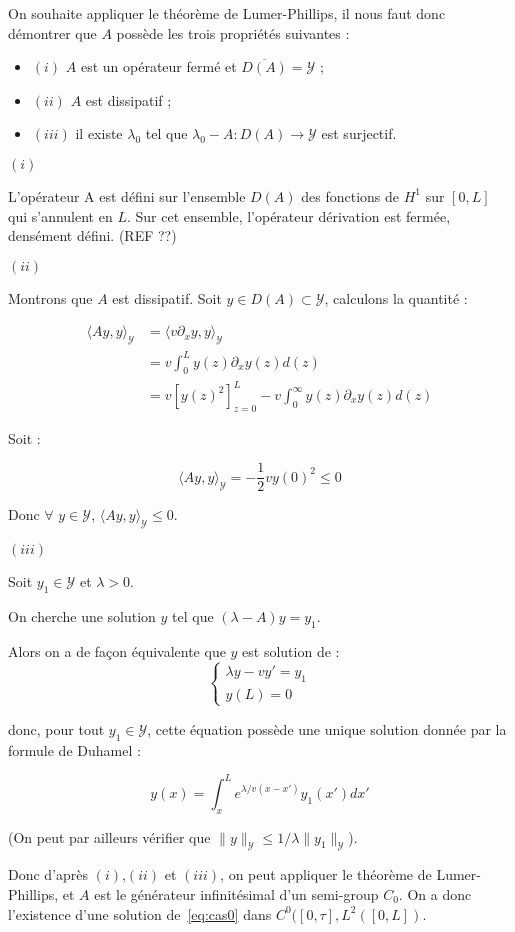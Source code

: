 \documentclass[a4paper]{article}
\begin{document}
\begin{preuve}
	On souhaite appliquer le théorème de Lumer-Phillips, 
	il nous faut donc démontrer que $A$ possède les trois propriétés suivantes :
\begin{itemize}
	\item $(i)$ $A$ est un opérateur fermé et $\overline{D(A)} = \mathscr{Y}$ ;
	\item $(ii)$ $A$ est dissipatif ;
	\item $(iii)$ il existe $\lambda_0$ tel que $\lambda_0 - A : D(A) \to \mathscr{Y}$ est surjectif.
\end{itemize}

\vspace{0.3cm}
$(i)$

L'opérateur A est défini sur l'ensemble $D(A)$ des fonctions de $H^1$ sur $[0,L]$ qui s'annulent en $L$. 
Sur cet ensemble, l'opérateur dérivation est fermée, densément défini.
(REF ??)


\vspace{0.3cm}
$(ii)$

Montrons que $A$ est dissipatif.
Soit $y \in D(A) \subset \mathscr{Y}$, 
calculons la quantité :

\[ \begin{split}
\langle Ay,y \rangle_{\mathscr{Y}} &= \langle v \partial_x y, y \rangle_{\mathscr{Y}}  \\
                     &= v \int_0^L y(z) \partial_x y(z) d(z) \\
					 & = v[y(z)^2]_{z=0}^L - v \int_0^\infty y(z) \partial_x y(z) d(z)
\end{split} \]

Soit :

\[ \langle Ay,y \rangle_{\mathscr{Y}} = -\frac{1}{2}vy(0)^2 \leq 0 \]

Donc $\forall$ $y \in \mathscr{Y}$, $\langle Ay,y \rangle_{\mathscr{Y}} \leq 0$.


\vspace{0.3cm}
$(iii)$

Soit $y_1 \in \mathscr{Y}$ et $\lambda >0$.

On cherche une solution $y$ tel que $(\lambda -A)y = y_1$.

Alors on a de façon équivalente que $y$ est solution de :
\[ \begin{cases}
\lambda y - v y' = y_1 \\
y(L) = 0
\end{cases}\]

donc, pour tout $y_1 \in \mathscr{Y}$, cette équation possède une unique solution donnée par la formule de Duhamel :

\[ y(x) =  \int_x^L e^{\lambda/v (x-x')}y_1(x')dx' \]

(On peut par ailleurs vérifier que $ \| y \|_{\mathscr{Y}} \leq 1/ \lambda \|y_1 \|_{\mathscr{Y}}$).

Donc d'après $(i)$,$(ii)$ et $(iii)$, on peut appliquer le théorème de Lumer-Phillips, et $A$ est le générateur infinitésimal d'un semi-group $C_0$.
On a donc l'existence d'une solution de~\eqref{eq:cas0} 
dans $C^0([0,\tau],L^2([0,L])$.
	
\end{preuve}
\end{document}
